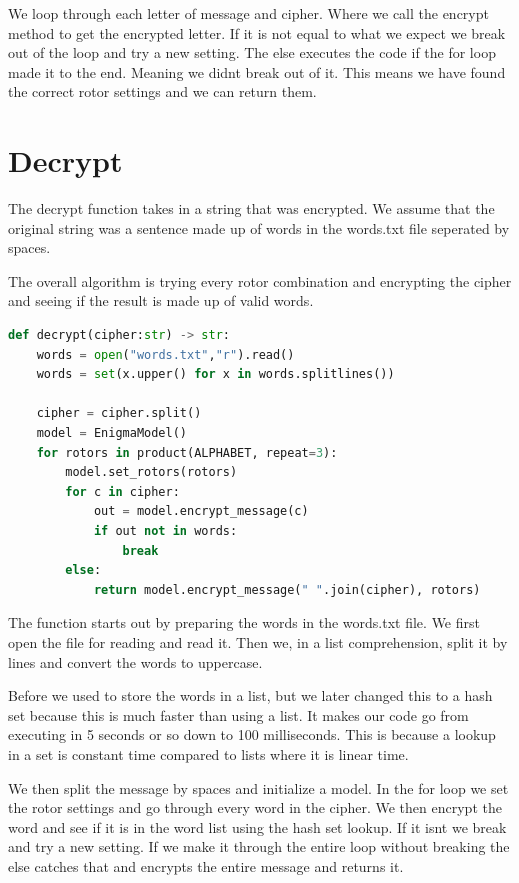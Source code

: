 \documentclass{article}
\begin{document}
We loop through each letter of message and cipher. Where we call the  encrypt method to get the encrypted letter. If it is not equal to what we expect we break out of the loop and try a new setting. The else executes the code if the for loop made it to the end. Meaning we didnt break out of it. This means we have found the correct rotor settings and we can return them. 

\section{Decrypt}
The decrypt function takes in a string that was encrypted. We assume that the original string was a sentence made up of words in the words.txt file seperated by spaces.

The overall algorithm is trying every rotor combination and encrypting the cipher and seeing if the result is made up of valid words.

\begin{lstlisting}[language=Python]
def decrypt(cipher:str) -> str:
    words = open("words.txt","r").read()
    words = set(x.upper() for x in words.splitlines())

    cipher = cipher.split()
    model = EnigmaModel()
    for rotors in product(ALPHABET, repeat=3):
        model.set_rotors(rotors)
        for c in cipher:
            out = model.encrypt_message(c)
            if out not in words:
                break
        else:
            return model.encrypt_message(" ".join(cipher), rotors)
\end{lstlisting}
The function starts out by preparing the words in the words.txt file. We first open the file for reading and read it. Then we, in a list comprehension, split it by lines and convert the words to uppercase. 

Before we used to store the words in a list, but we later changed this to  a hash set because this is much faster than using a list. It makes our code go from executing in 5 seconds or so down to 100 milliseconds. This is because a lookup in a set is constant time compared to lists where it is linear time.

We then split the message by spaces and initialize a model. In the for loop we set the rotor settings and go through every word in the cipher. We then encrypt the word and see if it is in the word list using the hash set lookup. If it isnt we break and try a new setting. If we make it through the entire loop without breaking the else catches that and encrypts the entire message and returns it.
\end{document}
